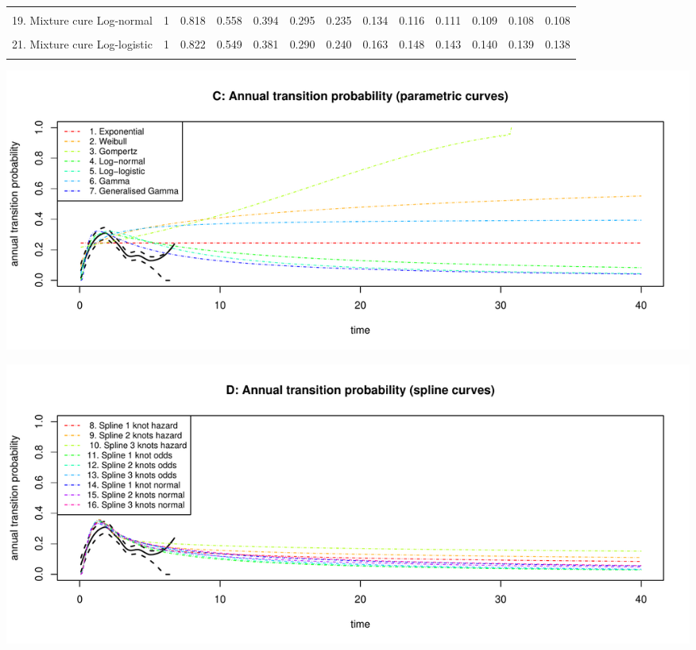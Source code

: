 \documentclass[]{article}
\begin{document}
\begin{table}
{\begin{tabular}[t]{lrrrrrrrrrrrr}
\cellcolor{gray!6}{18. Non-mixture cure Weibull} & \cellcolor{gray!6}{1} & \cellcolor{gray!6}{0.820} & \cellcolor{gray!6}{0.570} & \cellcolor{gray!6}{0.391} & \cellcolor{gray!6}{0.285} & \cellcolor{gray!6}{0.228} & \cellcolor{gray!6}{0.169} & \cellcolor{gray!6}{0.168} & \cellcolor{gray!6}{0.168} & \cellcolor{gray!6}{0.168} & \cellcolor{gray!6}{0.168} & \cellcolor{gray!6}{0.168}\\
19. Mixture cure Log-normal & 1 & 0.818 & 0.558 & 0.394 & 0.295 & 0.235 & 0.134 & 0.116 & 0.111 & 0.109 & 0.108 & 0.108\\
\cellcolor{gray!6}{20. Non-mixture cure Log-normal} & \cellcolor{gray!6}{1} & \cellcolor{gray!6}{0.818} & \cellcolor{gray!6}{0.551} & \cellcolor{gray!6}{0.390} & \cellcolor{gray!6}{0.297} & \cellcolor{gray!6}{0.241} & \cellcolor{gray!6}{0.143} & \cellcolor{gray!6}{0.118} & \cellcolor{gray!6}{0.109} & \cellcolor{gray!6}{0.105} & \cellcolor{gray!6}{0.103} & \cellcolor{gray!6}{0.101}\\
21. Mixture cure Log-logistic & 1 & 0.822 & 0.549 & 0.381 & 0.290 & 0.240 & 0.163 & 0.148 & 0.143 & 0.140 & 0.139 & 0.138\\
\cellcolor{gray!6}{22. Non-mixture cure Log-logistic} & \cellcolor{gray!6}{1} & \cellcolor{gray!6}{0.823} & \cellcolor{gray!6}{0.549} & \cellcolor{gray!6}{0.380} & \cellcolor{gray!6}{0.293} & \cellcolor{gray!6}{0.246} & \cellcolor{gray!6}{0.178} & \cellcolor{gray!6}{0.165} & \cellcolor{gray!6}{0.161} & \cellcolor{gray!6}{0.158} & \cellcolor{gray!6}{0.157} & \cellcolor{gray!6}{0.157}\\
\bottomrule
\end{tabular}}
\end{table}

\begin{flushleft}\includegraphics[height=0.29\textheight]{Images/validate_extrapolation3-3} \end{flushleft}

\begin{flushleft}\includegraphics[height=0.29\textheight]{Images/validate_extrapolation3-4} \end{flushleft}
\end{document}
